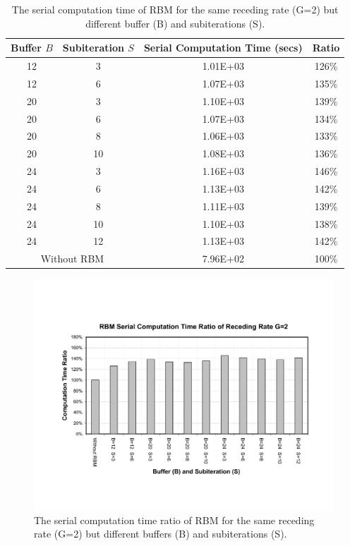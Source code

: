 \begin{table}[h]
\vspace{1.5in}
\caption{The serial computation time of RBM for the same receding rate (G=2) but different buffer (B) and subiterations (S).}
\small
\begin{center}
\begin{tabular}{cccc} \hline
Buffer $B$ & Subiteration $S$ & Serial Computation Time (secs) & Ratio \\ \hline
  12  &  3  & 1.01E+03  &  126\% \\
  12  &  6  & 1.07E+03  &  135\% \\
  20  &  3  & 1.10E+03  &  139\% \\
  20  &  6  & 1.07E+03  &  134\% \\
  20  &  8  & 1.06E+03  &  133\% \\
  20  &  10 & 1.08E+03  &  136\% \\
  24  &  3  & 1.16E+03  &  146\% \\
  24  &  6  & 1.13E+03  &  142\% \\
  24  &  8  & 1.11E+03  &  139\% \\
  24  &  10 & 1.10E+03  &  138\% \\
  24  &  12 & 1.13E+03  &  142\% \\ \hline
\multicolumn{2}{c}{Without RBM} & 7.96E+02  &  100\%  \\ \hline
\end{tabular}
\end{center}
\label{tab:RBM-computation-time}
\end{table}

\cp
\begin{figure}[htbp]
\vspace{1.5in}
  \begin{center}    \includegraphics[width=5.2in]{../figures/Exp3-CASE1-dt0.005/RBM-Computaion-Time.pdf}
    \caption{The serial computation time ratio of RBM for the same receding rate (G=2) but different buffers (B) and subiterations (S).}
    \label{fig:RBM-Den-Error-G2}
  \end{center}
\end{figure}

